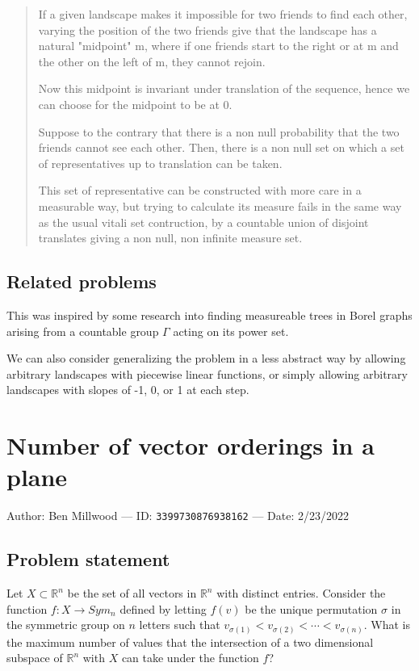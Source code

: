 \documentclass[10pt]{article}
\begin{document}
\begin{quote}
  If a given landscape makes it impossible for two friends to find each other, varying the position of the two friends give that the landscape has a natural "midpoint" m, where if one friends start to the right or at m and the other on the left of m, they cannot rejoin. 

  Now this midpoint is invariant under translation of the sequence, hence we can choose for the midpoint to be at 0.

  Suppose to the contrary that there is a non null probability that the two friends cannot see each other. Then, there is a non null set on which a set of representatives up to translation can be taken.

  This set of representative can be constructed with more care in a measurable way, but trying to calculate its measure fails in the same way as the usual vitali set contruction, by a countable union of disjoint translates giving a non null, non infinite measure set.
\end{quote}

\subsection{Related problems}

This was inspired by some research into finding measureable trees in Borel graphs arising from a countable group $\Gamma$ acting on its power set.

We can also consider generalizing the problem in a less abstract way by allowing arbitrary landscapes with piecewise linear functions, or simply allowing arbitrary landscapes with slopes of -1, 0, or 1 at each step.

\pagebreak

\section{Number of vector orderings in a plane}

Author: Ben Millwood --- ID: \verb`3399730876938162` --- Date: 2/23/2022

\subsection{Problem statement}

Let $X\subset\mathbb{R}^n$ be the set of all vectors in $\mathbb{R}^n$ with distinct entries. Consider the function $f:X\to Sym_n$ defined by letting $f(v)$ be the unique permutation $\sigma$ in the symmetric group on $n$ letters such that $v_{\sigma(1)}<v_{\sigma(2)}<\cdots< v_{\sigma(n)}$. What is the maximum number of values that the intersection of a two dimensional subspace of $\mathbb{R}^n$ with $X$ can take under the function $f$?
\end{document}
